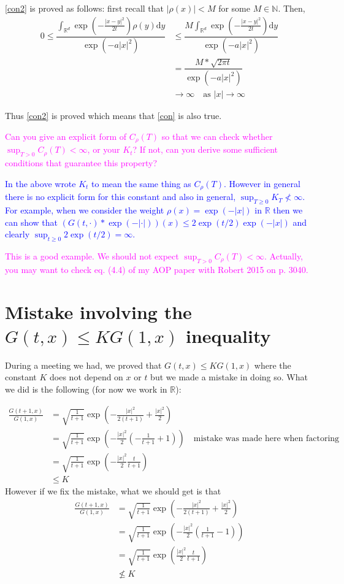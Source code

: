 \documentclass{article}
\numberwithin{equation}{section}
\newcommand{\R}{\mathbb{R}}
\newcommand{\ud}{\ensuremath{\mathrm{d}}}
\begin{document}
\eqref{con2} is proved as follows: first recall that $|\rho(x)| < M$ for some $M \in \mathbb N$. Then,
\begin{align*}
0 \le	\dfrac{\int_{\mathbb R^d}\exp\left(-\frac{|x-y|^2}{2t}\right)\rho(y)\ud y}{\exp\left(-a|x|^2\right)} &\le \dfrac{M\int_{\mathbb R^d}\exp\left(-\frac{|x-y|^2}{2t}\right) \ud y}{\exp\left(-a|x|^2\right)}
\\&  = \dfrac{M*\sqrt{2 \pi t}}{\exp\left(-a|x|^2\right)}
\\& \to \infty \quad \text{as } |x|\to \infty
\end{align*}

Thus \eqref{con2} is proved which means that \eqref{con} is also true.

\bigskip

\textcolor{magenta}{Can you give an explicit form of $C_\rho(T)$ so that we can check whether $\sup_{T>0}C_\rho(T)<\infty$, or your $K_t$? If not, can you derive some sufficient conditions that guarantee this
property?}

\textcolor{blue}{In the above wrote $K_t$ to mean the same thing as $C_\rho(T)$.
	However in general there is no explicit form for this constant and also in general, $\sup_{T \ge 0}K_T \not < \infty$.
For example, when we consider the weight $\rho(x)=\exp(-|x|)$ in $\R$ then we can show that $(G(t,\cdot)*\exp(-|\cdot|))(x) \le 2\exp(t/2) \exp(-|x|)$ and clearly $\sup_{t \ge 0} 2\exp(t/2) = \infty$.}
\bigskip

\textcolor{magenta}{This is a good example. We should not expect $\sup_{T>0}C_\rho(T)<\infty$. Actually, you may want to check eq. (4.4) of my AOP paper with Robert 2015 on p. 3040. }

\section{Mistake involving the $G(t,x) \le K G(1,x)$ inequality}
During a meeting we had, we proved that $G(t,x) \le K G(1,x)$ where the constant $K$ does not depend on $x$ or $t$ but we made a mistake in doing so. What we did is the following (for now we work in $\R$):

\begin{align*}
\frac{G(t+1,x)}{G(1,x)} &= \sqrt{\frac{1}{t+1}}\exp\left( -\frac{|x|^2}{2(t+1)} + \frac{|x|^2}{2}\right)
\\& = \sqrt{\frac{1}{t+1}}\exp\left( -\frac{|x|^2}{2} \left(-\frac{1}{t+1}+ 1\right)\right) \quad \text{mistake was made here when factoring}
\\& = \sqrt{\frac{1}{t+1}}\exp\left( -\frac{|x|^2}{2}\frac{t}{t+1}\right)
\\& \le K
\end{align*}
However if we fix the mistake, what we should get is that
\begin{align*}
\frac{G(t+1,x)}{G(1,x)} &= \sqrt{\frac{1}{t+1}}\exp\left( -\frac{|x|^2}{2(t+1)} + \frac{|x|^2}{2}\right)
\\& = \sqrt{\frac{1}{t+1}}\exp\left( -\frac{|x|^2}{2} \left(\frac{1}{t+1}- 1\right)\right)
\\& = \sqrt{\frac{1}{t+1}}\exp\left( \frac{|x|^2}{2} \frac{t}{t+1} \right)
\\& \not \le K
\end{align*}
\end{document}
